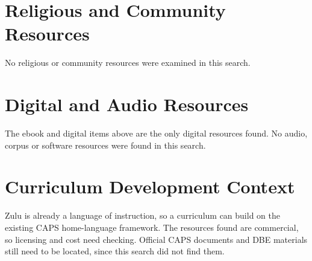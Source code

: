 \documentclass[12pt]{article}
\begin{document}
\section{Religious and Community Resources}
No religious or community resources were examined in this search.

\section{Digital and Audio Resources}
The ebook and digital items above are the only digital resources found. No audio, corpus or software resources were found in this search.

\section{Curriculum Development Context}
Zulu is already a language of instruction, so a curriculum can build on the existing CAPS home-language framework. The resources found are commercial, so licensing and cost need checking. Official CAPS documents and DBE materials still need to be located, since this search did not find them.
\end{document}
